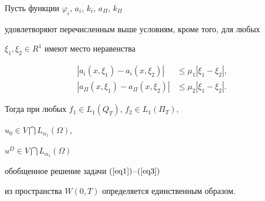 \begin{thmnonum}


Пусть функции $\varphi_{i}$, $ a_{i}$, $k_{i}$, $a_{\Pi}$, $k_{\Pi}$


удовлетворяют перечисленным выше условиям, кроме того, для любых


$\xi_{1}, \xi_{2} \in R^1$ имеют место неравенства


\begin{equation} \label{eq23} 


\begin{split}


| a_{i}(x, \xi_{1})-a_{i}(x, \xi_{2})| &\leq \mu_{1} |\xi_{1}-\xi_{2}|,\\




| a_{\Pi}(x, \xi_{1})-a_{\Pi}(x, \xi_{2})| &\leq \mu_{2} |\xi_{1}-\xi_{2}|.


\end{split}


\end{equation}


Тогда при любых $f_{1} \in L_{1}(Q_{T})$, $f_{2} \in L_{1}(\Pi_{T})$,


$u_{0} \in V \bigcap L_{\alpha_{1}}(\Omega)$,


$ u^{D} \in V \bigcap L_{\alpha_{1}}(\Omega)$


обобщенное решение задачи $(\ref{eq1})$--$(\ref{eq3})$


из пространства $W(0,T)$ определяется единственным образом. 


\end{thmnonum}





